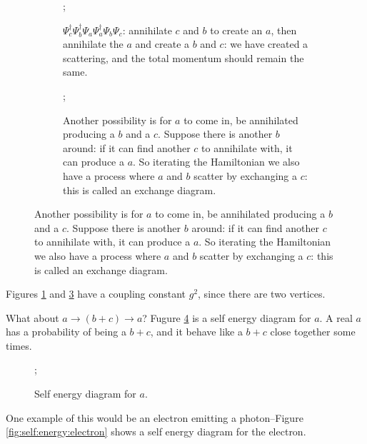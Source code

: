 \documentclass[]{article}
\begin{document}
\begin{figure}[H]
	\caption{What is the effect of $H^2$?}
	\begin{subfigure}[t]{0.45\textwidth}
		\begin{center}
			\caption{$\Psi^\dagger_c\Psi^\dagger_b\Psi_a\Psi^\dagger_a\Psi_b\Psi_c$: annihilate $c$ and $b$ to create an $a$, then annihilate the $a$ and create a $b$ and $c$: we have created a scattering, and the total momentum should remain the same.}\label{fig:scatter:annihilate}
			;
		\end{center}
	\end{subfigure}
	\hfill
	\begin{subfigure}[t]{0.45\textwidth}
		\caption{Another possibility is for $a$ to come in, be annihilated producing a $b$ and a $c$. Suppose there is another $b$ around: if it can find another $c$ to annihilate with, it can produce a $a$. So iterating the Hamiltonian we also have a process where $a$ and $b$ scatter by exchanging a $c$: this is called an exchange diagram.}\label{fig:additional:particle}
		;
	\end{subfigure}
\end{figure}

Figures \ref{fig:scatter:annihilate} and \ref{fig:additional:particle} have a coupling constant $g^2$, since there are two vertices.

What about $a\rightarrow (b+c)\rightarrow a$? Fugure \ref{fig:self:energy:a} is a self energy diagram for $a$. A real $a$ has a probability of being a $b+c$, and it behave like a $b+c$ close together some times.
\begin{figure}[H]
	\begin{center}
		\caption{Self energy diagram for $a$.}\label{fig:self:energy:a}
		;
	\end{center}
\end{figure}
One example of this would be an electron emitting a photon--Figure \ref{fig:self:energy:electron} shows a self energy diagram for the electron.
\end{document}
